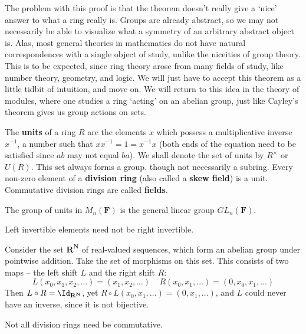 The problem with this proof is that the theorem doesn't really give a `nice' answer to what a ring really is. Groups are already abstract, so we may not necessarily be able to visualize what a symmetry of an arbitrary abstract object is. Alas, most general theories in mathematics do not have natural correspondences with a single object of study, unlike the niceities of group theory. This is to be expected, since ring theory arose from many fields of study, like number theory, geometry, and logic. We will just have to accept this theorem as a little tidbit of intuition, and move on. We will return to this idea in the theory of modules, where one studies a ring `acting' on an abelian group, just like Cayley's theorem gives us group actions on sets.

\begin{definition}
    The {\bf units} of a ring $R$ are the elements $x$ which possess a multiplicative inverse $x^{-1}$, a number such that $xx^{-1} = 1 = x^{-1}x$ (both ends of the equation need to be satisfied since $ab$ may not equal $ba$). We shall denote the set of units by $R^\times$ or $U(R)$. This set always forms a group. though not necessarily a subring. Every non-zero element of a {\bf division ring} (also called a {\bf skew field}) is a unit. Commutative division rings are called {\bf fields}.
\end{definition}

\begin{example}
    The group of units in $M_n(\mathbf{F})$ is the general linear group $GL_n(\mathbf{F})$.
\end{example}

Left invertible elements need not be right invertible.

\begin{example}
    Consider the set $\mathbf{R}^\mathbf{N}$ of real-valued sequences, which form an abelian group under pointwise addition. Take the set of morphisms on this set. This consists of two maps -- the left shift $L$ and the right shift $R$:
    \[ L(x_0, x_1, x_2, \dots) = (x_1, x_2, \dots)\ \ \ \ \ R(x_0, x_1, \dots) = (0, x_0, x_1, \dots) \]
    Then $L \circ R = \Id_{\mathbf{R}^\mathbf{N}}$, yet $R \circ L(x_0, x_1, \dots) = (0, x_1, \dots)$, and $L$ could never have an inverse, since it is not bijective.
\end{example}

Not all division rings need be commutative.

